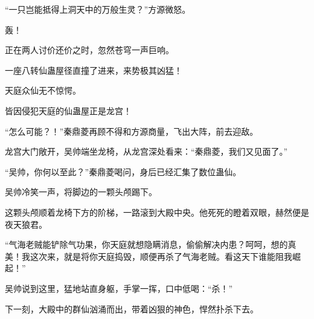 \begin{this_body}
“一只岂能抵得上洞天中的万般生灵？”方源微怒。

轰！

正在两人讨价还价之时，忽然苍穹一声巨响。

一座八转仙蛊屋径直撞了进来，来势极其凶猛！

天庭众仙无不惊愕。

皆因侵犯天庭的仙蛊屋正是龙宫！

“怎么可能？！”秦鼎菱再顾不得和方源商量，飞出大阵，前去迎敌。

龙宫大门敞开，吴帅端坐龙椅，从龙宫深处看来：“秦鼎菱，我们又见面了。”

“吴帅，你何以至此？”秦鼎菱喝问，身后已经汇集了数位蛊仙。

吴帅冷笑一声，将脚边的一颗头颅踢下。

这颗头颅顺着龙椅下方的阶梯，一路滚到大殿中央。他死死的瞪着双眼，赫然便是夜天狼君。

“气海老贼能铲除气功果，你天庭就想隐瞒消息，偷偷解决内患？呵呵，想的真美！我这次来，就是将你天庭捣毁，顺便再杀了气海老贼。看这天下谁能阻我崛起！”

吴帅说到这里，猛地站直身躯，手掌一挥，口中低喝：“杀！”

下一刻，大殿中的群仙汹涌而出，带着凶狠的神色，悍然扑杀下去。

\end{this_body}

